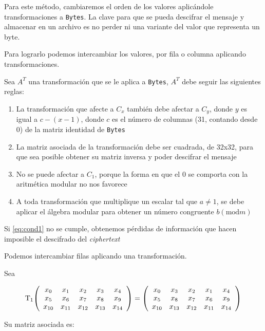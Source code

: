 \documentclass[a4paper]{article}
\newcommand*{\Scale}[2][4]{\scalebox{#1}{$#2$}}%
\begin{document}
Para este método, cambiaremos el orden de los valores aplicándole
transformaciones a \texttt{Bytes}. La clave para que se pueda descifrar el mensaje y almacenar en un archivo es no perder ni una variante del valor que representa un byte. 

Para lograrlo podemos intercambiar los valores, por fila o columna aplicando transformaciones.

Sea $A^T$ una transformación que se le aplica a \texttt{Bytes}, $A^T$ debe
seguir
las siguientes reglas:

\begin{enumerate}
    \item La transformación que afecte a $C_x$ también debe afectar a $C_y$,
donde $y$ es igual a $c-(x-1)$\label{eq:cond1}, donde $c$ es el número de
columnas (31, contando desde 0) de la matriz identidad de \texttt{Bytes}
    \item La matriz asociada de la transformación debe ser cuadrada, de 32x32, para que sea posible
obtener su matriz inversa y poder descifrar el mensaje
    \item No se puede afectar a $C_1$, porque la forma en que el 0 se comporta con la aritmética modular no nos favorece
    \item A toda transformación que multiplique un escalar tal que $a \neq 1$, se debe aplicar el álgebra modular para obtener un número congruente $b (\text{mod} m)$ 
\end{enumerate}

Si \eqref{eq:cond1} no se cumple, obtenemos pérdidas de información que hacen
imposible el descifrado del \textit{ciphertext}

Podemos intercambiar filas aplicando una transformación.

Sea

 \[
\text{T}_1 \Scale[1]{
\left(
    \begin{array}{ccccc}
        x_0 & x_1 & x_2 & x_3 & x_4\\
        x_5 & x_6 & x_7 & x_8 & x_9\\
        x_{10} & x_{11} & x_{12} & x_{13} & x_{14}
    \end{array}
\right)
= 
\left(
\begin{array}{ccccc}
 x_0 & x_3 & x_2 & x_1 & x_4 \\
 x_5 & x_8 & x_7 & x_6 & x_9 \\
 x_{10} & x_{13} & x_{12} & x_{11} & x_{14}
\end{array}
\right) 
}
\]

Su matriz asociada es:
\end{document}
